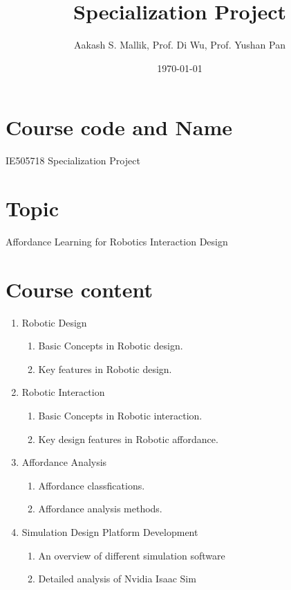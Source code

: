 \documentclass[letterpaper,12pt]{article}
\begin{document}
\title{Specialization Project}
\author{Aakash S. Mallik, Prof. Di Wu, Prof. Yushan Pan}
\date{\today}
\maketitle



\section{Course code and Name}

IE505718 Specialization Project

\section{Topic}

Affordance Learning for Robotics Interaction Design 

\section{Course content}

\begin{enumerate}
    \item Robotic Design
        \begin{enumerate}
    		\item Basic Concepts in Robotic design.
    		\item Key features in Robotic design. 
    	\end{enumerate}
    \item Robotic Interaction
        \begin{enumerate}
    		\item Basic Concepts in Robotic interaction.
    		\item Key design features in Robotic affordance. 
    	\end{enumerate}  
    \item Affordance Analysis
        \begin{enumerate}
    		\item Affordance classfications.
    		\item Affordance analysis methods. 
    	\end{enumerate}
    \item Simulation Design Platform Development
    	\begin{enumerate}
    		\item An overview of different simulation software
    		\item Detailed analysis of Nvidia Isaac Sim
    	\end{enumerate}
\end{enumerate}
\end{document}

